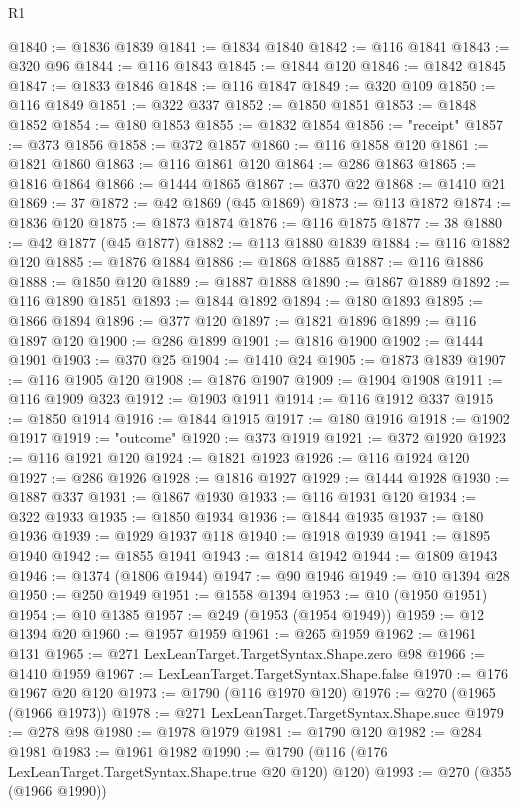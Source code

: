 \begin{lexlean}{R1}
\begin{coremodule}
@1840 := @1836 @1839
@1841 := @1834 @1840
@1842 := @116 @1841
@1843 := @320 @96
@1844 := @116 @1843
@1845 := @1844 @120
@1846 := @1842 @1845
@1847 := @1833 @1846
@1848 := @116 @1847
@1849 := @320 @109
@1850 := @116 @1849
@1851 := @322 @337
@1852 := @1850 @1851
@1853 := @1848 @1852
@1854 := @180 @1853
@1855 := @1832 @1854
@1856 := "receipt"
@1857 := @373 @1856
@1858 := @372 @1857
@1860 := @116 @1858 @120
@1861 := @1821 @1860
@1863 := @116 @1861 @120
@1864 := @286 @1863
@1865 := @1816 @1864
@1866 := @1444 @1865
@1867 := @370 @22
@1868 := @1410 @21
@1869 := 37
@1872 := @42 @1869 (@45 @1869)
@1873 := @113 @1872
@1874 := @1836 @120
@1875 := @1873 @1874
@1876 := @116 @1875
@1877 := 38
@1880 := @42 @1877 (@45 @1877)
@1882 := @113 @1880 @1839
@1884 := @116 @1882 @120
@1885 := @1876 @1884
@1886 := @1868 @1885
@1887 := @116 @1886
@1888 := @1850 @120
@1889 := @1887 @1888
@1890 := @1867 @1889
@1892 := @116 @1890 @1851
@1893 := @1844 @1892
@1894 := @180 @1893
@1895 := @1866 @1894
@1896 := @377 @120
@1897 := @1821 @1896
@1899 := @116 @1897 @120
@1900 := @286 @1899
@1901 := @1816 @1900
@1902 := @1444 @1901
@1903 := @370 @25
@1904 := @1410 @24
@1905 := @1873 @1839
@1907 := @116 @1905 @120
@1908 := @1876 @1907
@1909 := @1904 @1908
@1911 := @116 @1909 @323
@1912 := @1903 @1911
@1914 := @116 @1912 @337
@1915 := @1850 @1914
@1916 := @1844 @1915
@1917 := @180 @1916
@1918 := @1902 @1917
@1919 := "outcome"
@1920 := @373 @1919
@1921 := @372 @1920
@1923 := @116 @1921 @120
@1924 := @1821 @1923
@1926 := @116 @1924 @120
@1927 := @286 @1926
@1928 := @1816 @1927
@1929 := @1444 @1928
@1930 := @1887 @337
@1931 := @1867 @1930
@1933 := @116 @1931 @120
@1934 := @322 @1933
@1935 := @1850 @1934
@1936 := @1844 @1935
@1937 := @180 @1936
@1939 := @1929 @1937 @118
@1940 := @1918 @1939
@1941 := @1895 @1940
@1942 := @1855 @1941
@1943 := @1814 @1942
@1944 := @1809 @1943
@1946 := @1374 (@1806 @1944)
@1947 := @90 @1946
@1949 := @10 @1394 @28
@1950 := @250 @1949
@1951 := @1558 @1394
@1953 := @10 (@1950 @1951)
@1954 := @10 @1385
@1957 := @249 (@1953 (@1954 @1949))
@1959 := @12 @1394 @20
@1960 := @1957 @1959
@1961 := @265 @1959
@1962 := @1961 @131
@1965 := @271 LexLeanTarget.TargetSyntax.Shape.zero @98
@1966 := @1410 @1959
@1967 := LexLeanTarget.TargetSyntax.Shape.false
@1970 := @176 @1967 @20 @120
@1973 := @1790 (@116 @1970 @120)
@1976 := @270 (@1965 (@1966 @1973))
@1978 := @271 LexLeanTarget.TargetSyntax.Shape.succ
@1979 := @278 @98
@1980 := @1978 @1979
@1981 := @1790 @120
@1982 := @284 @1981
@1983 := @1961 @1982
@1990 := @1790 (@116 (@176 LexLeanTarget.TargetSyntax.Shape.true @20 @120) @120)
@1993 := @270 (@355 (@1966 @1990))

\end{coremodule}
\end{lexlean}
